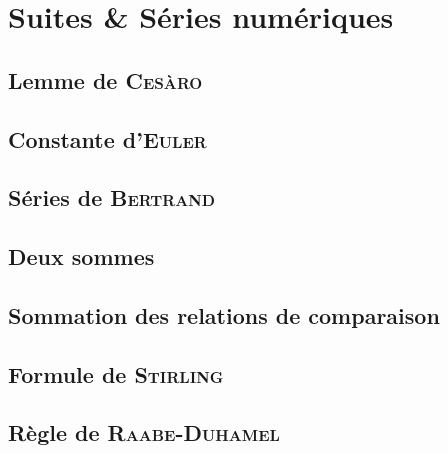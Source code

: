 \chapter{Suites \& Séries numériques}



\newpage

\section{Lemme de \textsc{Cesàro}} \label{lemme_cesaro}


\section{Constante d'\textsc{Euler}}


\section{Séries de \textsc{Bertrand}}


\section{Deux sommes} \label{deux_sommes}


\section{Sommation des relations de comparaison} \label{sommation_relations_comparaison}


\section{Formule de \textsc{Stirling}}
\label{preuve_stirling}


\section{Règle de \textsc{Raabe-Duhamel}}


